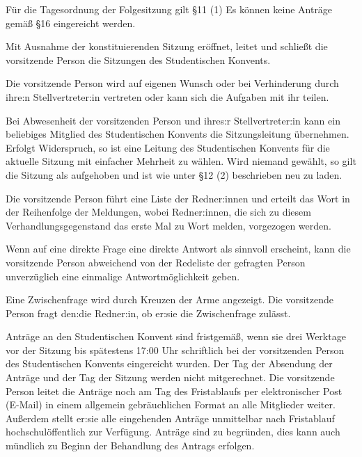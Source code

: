 \documentclass[10pt,a4paper]{scrartcl}
\begin{document}
\begin{contract}
	Für die Tagesordnung der Folgesitzung gilt §11 (1) Es können keine
  Anträge gemäß §16 eingereicht werden.



\label{leitung-der-sitzung}

Mit Ausnahme der konstituierenden Sitzung eröffnet, leitet und
schließt die vorsitzende Person die Sitzungen des Studentischen
Konvents.

Die vorsitzende Person wird auf eigenen Wunsch oder bei Verhinderung
durch ihre:n Stellvertreter:in vertreten oder kann sich die Aufgaben mit ihr teilen.

Bei Abwesenheit der vorsitzenden Person und ihres:r Stellvertreter:in
kann ein beliebiges Mitglied des Studentischen Konvents die
Sitzungsleitung übernehmen. Erfolgt Widerspruch, so ist eine Leitung des
Studentischen Konvents für die aktuelle Sitzung mit einfacher Mehrheit
zu wählen. Wird niemand gewählt, so gilt die Sitzung als aufgehoben und
ist wie unter §12 (2) beschrieben neu zu laden.


\label{reihenfolge-der-rednerinnen}

Die vorsitzende Person führt eine Liste der Redner:innen und erteilt
das Wort in der Reihenfolge der Meldungen, wobei Redner:innen, die
sich zu diesem Verhandlungsgegenstand das erste Mal zu Wort melden,
vorgezogen werden.

Wenn auf eine direkte Frage eine direkte Antwort als sinnvoll
erscheint, kann die vorsitzende Person abweichend von der Redeliste
der gefragten Person unverzüglich eine einmalige Antwortmöglichkeit
geben.

Eine Zwischenfrage wird durch Kreuzen der Arme angezeigt. Die
vorsitzende Person fragt den:die Redner:in, ob er:sie die
Zwischenfrage zulässt.


\label{fristgemuxe4uxdfe-antruxe4ge}

Anträge an den Studentischen Konvent sind fristgemäß, wenn sie drei
Werktage vor der Sitzung bis spätestens 17:00 Uhr schriftlich bei der
vorsitzenden Person des Studentischen Konvents eingereicht wurden. Der
Tag der Absendung der Anträge und der Tag der Sitzung werden nicht
mitgerechnet. Die vorsitzende Person leitet die Anträge noch am Tag des
Fristablaufs per elektronischer Post (E-Mail) in einem allgemein
gebräuchlichen Format an alle Mitglieder weiter. Außerdem stellt er:sie
alle eingehenden Anträge unmittelbar nach Fristablauf
hochschulöffentlich zur Verfügung. Anträge sind zu begründen, dies kann
auch mündlich zu Beginn der Behandlung des Antrags erfolgen.



\end{contract}
\end{document}
